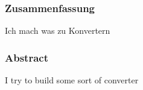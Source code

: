\subsubsection*{Zusammenfassung}
\label{sec:Zusammenfassung}

Ich mach was zu Konvertern

\subsubsection*{Abstract}
\label{sec:abstract}

I try to build some sort of converter

